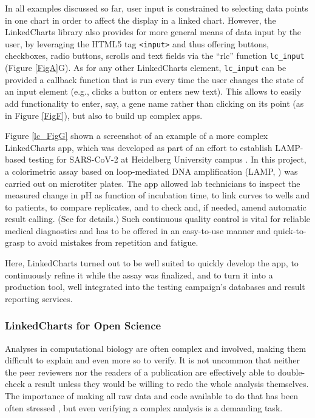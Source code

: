 \documentclass[twocolumn,10pt]{article}
\begin{document}
In all examples discussed so far, user input is constrained to selecting data points in one chart in order to affect the display in a linked chart. However, the LinkedCharts library also provides for more general means of data input by the user, by leveraging the HTML5 tag \texttt{<input>} and thus offering buttons, checkboxes, radio buttons, scrolls and text fields via the ``rlc'' function \texttt{lc_input} (Figure \ref{FigA}G). As for any other LinkedCharts element, \texttt{lc_input} can be provided a callback function that is run every time the user changes the state of an input element (e.g., clicks a button or enters new text). This allows to easily add functionality to enter, say, a gene name rather than clicking on its point (as in Figure \ref{FigF}), but also to build up complex apps.

Figure \ref{lc_FigG} shown a screenshot of an example of a more complex LinkedCharts app, which was developed as part of an effort to establish LAMP-based testing for SARS-CoV-2 at Heidelberg University campus \citep{daothi_2020}. In this project, a colorimetric assay based on loop-mediated DNA amplification (LAMP, \citep{notomi_2000}) was carried out on microtiter plates. The app allowed
lab technicians to inspect the measured change in pH as function of incubation time, to link curves to wells and to patients, to compare replicates, and to check and, if needed, amend automatic result calling. (See \citep{Lou_2023} for details.) Such continuous quality control is vital for reliable medical diagnostics and has to be offered in an easy-to-use manner and quick-to-grasp to avoid mistakes from repetition and fatigue.

Here, LinkedCharts turned out to be well suited to quickly develop the app, to continuously refine it while the assay was finalized, and to turn it into a production tool, well integrated into the testing campaign's databases and result reporting services.

\subsubsection{LinkedCharts for Open Science}

Analyses in computational biology are often complex and involved, making them difficult to explain and even more so to verify. It is not uncommon that neither the peer reviewers nor the readers of a publication are effectively able to double-check a result unless they would be willing to redo the whole analysis themselves. The importance of making all raw data and code available to do that has been often stressed \citep{gentleman_2005}, but even verifying a complex analysis is a demanding task.
\end{document}
